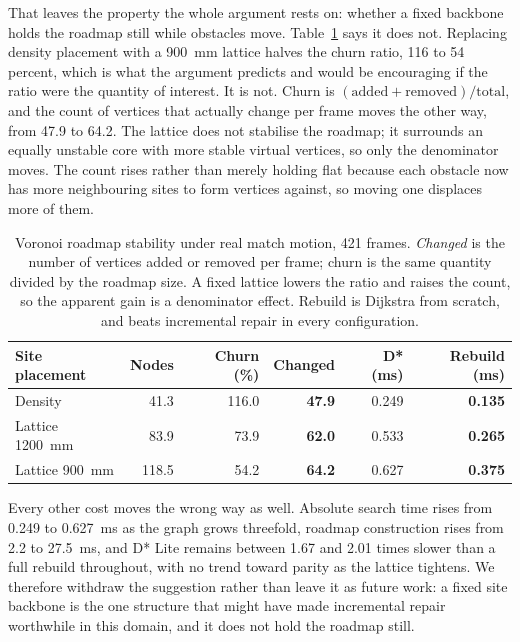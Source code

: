 That leaves the property the whole argument rests on: whether a fixed backbone
holds the roadmap still while obstacles move. Table~\ref{tab:lattice} says it
does not. Replacing density placement with a 900~mm lattice halves the churn
ratio, 116 to 54 percent, which is what the argument predicts and would be
encouraging if the ratio were the quantity of interest. It is not. Churn is
$(\mathrm{added} + \mathrm{removed}) / \mathrm{total}$, and the count of
vertices that actually change per frame moves the other way, from 47.9 to 64.2.
The lattice does not stabilise the roadmap; it surrounds an equally unstable
core with more stable virtual vertices, so only the denominator moves. The count
rises rather than merely holding flat because each obstacle now has more
neighbouring sites to form vertices against, so moving one displaces more of
them.

\begin{table}[t]
\centering
\small
\begin{tabular}{lrrrrr}
\hline
Site placement & Nodes & Churn (\%) & Changed & D* (ms) & Rebuild (ms) \\
\hline
Density        &  41.3 & 116.0 & \textbf{47.9} & 0.249 & \textbf{0.135} \\
Lattice 1200~mm &  83.9 &  73.9 & \textbf{62.0} & 0.533 & \textbf{0.265} \\
Lattice 900~mm & 118.5 &  54.2 & \textbf{64.2} & 0.627 & \textbf{0.375} \\
\hline
\end{tabular}
\caption{Voronoi roadmap stability under real match motion, 421 frames.
\emph{Changed} is the number of vertices added or removed per frame; churn is
the same quantity divided by the roadmap size. A fixed lattice lowers the ratio
and raises the count, so the apparent gain is a denominator effect. Rebuild is
Dijkstra from scratch, and beats incremental repair in every configuration.}
\label{tab:lattice}
\end{table}

Every other cost moves the wrong way as well. Absolute search time rises from
0.249 to 0.627~ms as the graph grows threefold, roadmap construction rises from
2.2 to 27.5~ms, and D* Lite remains between 1.67 and 2.01 times slower than a
full rebuild throughout, with no trend toward parity as the lattice tightens.
We therefore withdraw the suggestion rather than leave it as future work: a
fixed site backbone is the one structure that might have made incremental repair
worthwhile in this domain, and it does not hold the roadmap still.
